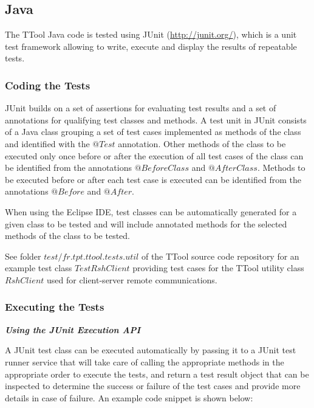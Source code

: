 \documentclass[12pt]{article}
\begin{document}
\subsection{Java}

The TTool Java code is tested using JUnit (\url{http://junit.org/}), which is a
unit test framework allowing to write, execute and display the results of
repeatable tests.

\subsubsection{Coding the Tests}

JUnit builds on a set of assertions for evaluating test results
and a set of annotations for qualifying test classes and methods. A test unit in
JUnit consists of a Java class grouping a set of test cases implemented as
methods of the class and identified with the $@Test$ annotation.
Other methods of the class to be executed only once before or after the
execution of all test cases of the class can be identified from the annotations
$@BeforeClass$ and $@AfterClass$. Methods to be executed before or after each
test case is executed can be identified from the annotations $@Before$ and
$@After$.

When using the Eclipse IDE, test classes can be automatically generated for a
given class to be tested and will include annotated methods for the selected
methods of the class to be tested.

See folder $test/fr.tpt.ttool.tests.util$ of the TTool source code repository
for an example test class $TestRshClient$ providing test cases for the TTool
utility class $RshClient$ used for client-server remote communications.

\subsubsection{Executing the Tests}

\textbf{\emph{Using the JUnit Execution API}}

A JUnit test class can be executed automatically by passing
it to a JUnit test runner service that will take care of calling the appropriate
methods in the appropriate order to execute the tests, and return a test result
object that can be inspected to determine the success or failure of the test
cases and provide more details in case of failure. An example code snippet is
shown below:
\end{document}

